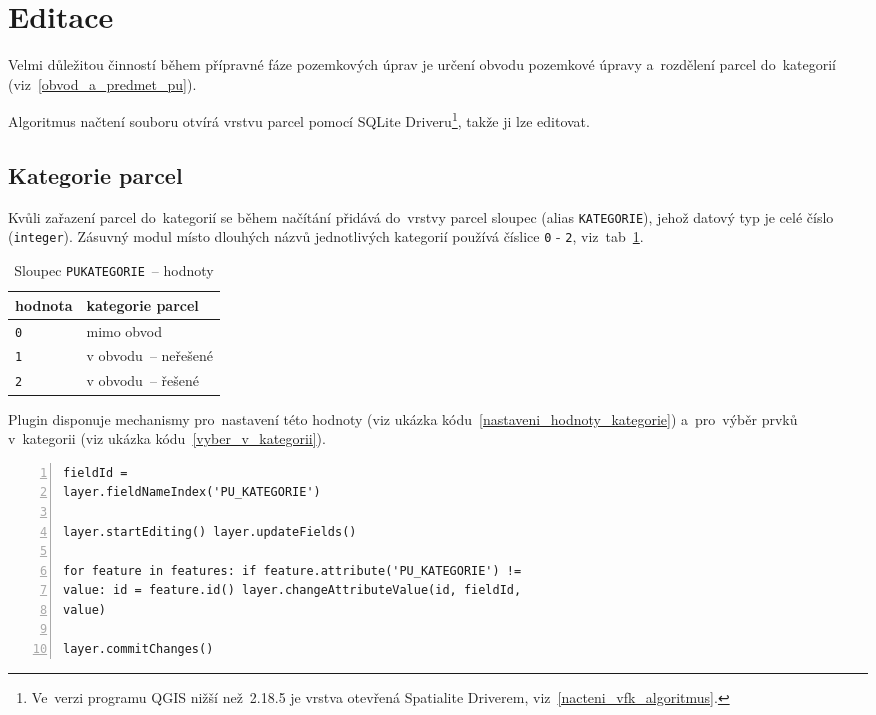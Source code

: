 \newpage

\section{Editace}
\label{editace}

Velmi důležitou činností během přípravné fáze pozemkových úprav je
určení obvodu pozemkové úpravy a~rozdělení parcel do~kategorií
(viz~\ref{obvod_a_predmet_pu}).

Algoritmus načtení  souboru otvírá vrstvu parcel pomocí SQLite
Driveru\footnote{Ve~verzi programu QGIS nižší než~2.18.5 je vrstva
otevřená Spatialite Driverem, viz~\ref{nacteni_vfk_algoritmus}.},
takže ji lze editovat.

\subsection{Kategorie parcel}
\label{kategorie_parcel}

Kvůli zařazení parcel do~kategorií se během načítání přidává do~vrstvy
parcel sloupec \texttt{} (alias
\texttt{KATEGORIE}), jehož datový typ je celé číslo
(\texttt{integer}). Zásuvný modul místo dlouhých názvů jednotlivých
kategorií používá číslice \texttt{0} - \texttt{2},
viz~tab~\ref{tab:kategorie_hodnoty}.

\begin{table}[H]
    \begin{tabular}{|l|l|} \hline hodnota & kategorie parcel \\ \hline
\hline \texttt{0} & mimo obvod \\ \hline \texttt{1} & v obvodu~–
neřešené \\ \hline \texttt{2} & v obvodu~– řešené \\ \hline
    \end{tabular} \centering
    \caption[Sloupec \texttt{PU\textunderscore KATEGORIE}~–
hodnoty]{Sloupec \texttt{PU\textunderscore KATEGORIE}~– hodnoty}
    \label{tab:kategorie_hodnoty}
\end{table}

Plugin disponuje mechanismy pro~nastavení této hodnoty (viz ukázka
kódu~\ref{nastaveni_hodnoty_kategorie}) a~pro~výběr prvků v~kategorii
(viz ukázka kódu~\ref{vyber_v_kategorii}).

{\scriptsize
\begin{lstlisting}[style=python, caption={Kategorie parcel~– nastavení
hodnoty}, captionpos=b, label=nastaveni_hodnoty_kategorie,
backgroundcolor = \color{light-gray}, numbers=left] fieldId =
layer.fieldNameIndex('PU_KATEGORIE')

layer.startEditing() layer.updateFields()

for feature in features: if feature.attribute('PU_KATEGORIE') !=
value: id = feature.id() layer.changeAttributeValue(id, fieldId,
value)

layer.commitChanges()
\end{lstlisting}}

